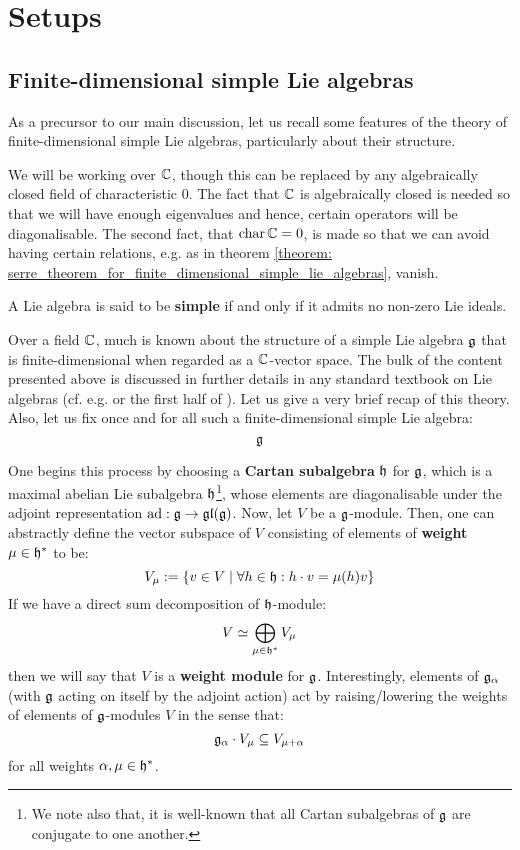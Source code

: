 \section{Setups}
    \subsection{Finite-dimensional simple Lie algebras} \label{subsection: finite_dimensional_simple_lie_algebras}
        As a precursor to our main discussion, let us recall some features of the theory of finite-dimensional simple Lie algebras, particularly about their structure.

        We will be working over $\mathbb{C}$, though this can be replaced by any algebraically closed field of characteristic $0$. The fact that $\mathbb{C}$ is algebraically closed is needed so that we will have enough eigenvalues and hence, certain operators will be diagonalisable. The second fact, that $\operatorname{char} \mathbb{C} = 0$, is made so that we can avoid having certain relations, e.g. as in theorem \ref{theorem: serre_theorem_for_finite_dimensional_simple_lie_algebras}, vanish.

        \begin{definition}
            A Lie algebra is said to be \textbf{simple} if and only if it admits no non-zero Lie ideals. 
        \end{definition}

        Over a field $\mathbb{C}$, much is known about the structure of a simple Lie algebra $\mathfrak{g}$ that is finite-dimensional when regarded as a $\mathbb{C}$-vector space. The bulk of the content presented above is discussed in further details in any standard textbook on Lie algebras (cf. e.g. \cite{humphreys_lie_algebras} or the first half of \cite{carter_affine_lie_algebras}). Let us give a very brief recap of this theory. Also, let us fix once and for all such a finite-dimensional simple Lie algebra:
            $$\mathfrak{g}$$

        One begins this process by choosing a \textbf{Cartan subalgebra} $\mathfrak{h}$ for $\mathfrak{g}$, which is a maximal abelian Lie subalgebra $\mathfrak{h}$\footnote{We note also that, it is well-known that all Cartan subalgebras of $\mathfrak{g}$ are conjugate to one another.}, whose elements are diagonalisable under the adjoint representation $\mathrm{ad}: \mathfrak{g} \to \mathfrak{gl}(\mathfrak{g})$. Now, let $V$ be a $\mathfrak{g}$-module. Then, one can abstractly define the vector subspace of $V$ consisting of elements of \textbf{weight} $\mu \in \mathfrak{h}^*$ to be:
            $$V_{\mu} := \{v \in V \mid \forall h \in \mathfrak{h}: h \cdot v = \mu(h) v\}$$
        If we have a direct sum decomposition of $\mathfrak{h}$-module:
            $$V \simeq \bigoplus_{\mu \in \mathfrak{h}^*} V_{\mu}$$
        then we will say that $V$ is a \textbf{weight module} for $\mathfrak{g}$. Interestingly, elements of $\mathfrak{g}_{\alpha}$ (with $\mathfrak{g}$ acting on itself by the adjoint action) act by raising/lowering the weights of elements of $\mathfrak{g}$-modules $V$ in the sense that:
            $$\mathfrak{g}_{\alpha} \cdot V_{\mu} \subseteq V_{\mu + \alpha}$$
        for all weights $\alpha, \mu \in \mathfrak{h}^*$. 
        
